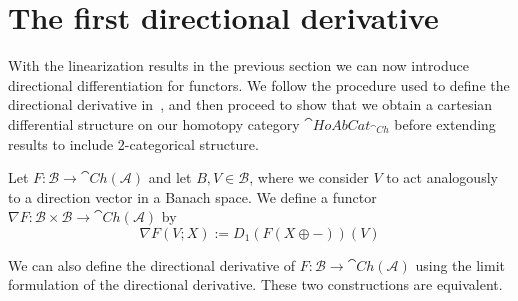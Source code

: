 \section{The first directional derivative}

With the linearization results in the previous section we can now introduce directional differentiation for functors. We follow the procedure used to define the directional derivative in~\cite{BJORT}, and then proceed to show that we obtain a cartesian differential structure on our homotopy category $\cat{HoAbCat}_{\cat{Ch}}$ before extending results to include $2$-categorical structure.

\begin{defn}[label=defn:DirectionalDeriv]
    Let $F:\mathcal{B}\to \cat{Ch}(\mathcal{A})$ and let $B,V \in \mathcal{B}$, where we consider $V$ to act analogously to a direction vector in a Banach space. We define a functor $\nabla F:\mathcal{B}\times \mathcal{B}\to \cat{Ch}(\mathcal{A})$ by 
    \begin{equation*}
        \nabla F(V;X) := D_1(F(X\oplus -))(V)
    \end{equation*}
\end{defn}

We can also define the directional derivative of $F:\mathcal{B}\to \cat{Ch}(\mathcal{A})$ using the limit formulation of the directional derivative. These two constructions are equivalent.

